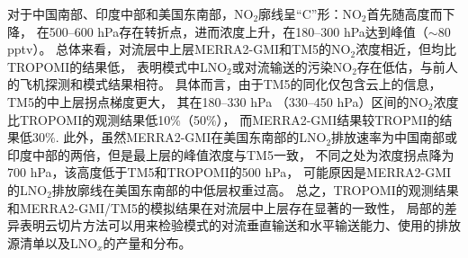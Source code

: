 对于中国南部、印度中部和美国东南部，NO$_2$廓线呈“C”形：NO$_2$首先随高度而下降，
在500--600 hPa存在转折点，进而浓度上升，在180--300 hPa达到峰值（$\sim$80 pptv）。
总体来看，对流层中上层MERRA2-GMI和TM5的NO$_2$浓度相近，但均比TROPOMI的结果低，
表明模式中LNO$_2$或对流输送的污染NO$_2$存在低估，与前人的飞机探测和模式结果相符\citep{Laughner.2019a}。
具体而言，由于TM5的同化仅包含云上的信息，TM5的中上层拐点梯度更大，
其在180--330 hPa （330--450 hPa）区间的NO$_2$浓度比TROPOMI的观测结果低10\%（50\%），
而MERRA2-GMI结果较TROPMI的结果低30\%.
此外，虽然MERRA2-GMI在美国东南部的LNO$_2$排放速率为中国南部或印度中部的两倍，但是最上层的峰值浓度与TM5一致，
不同之处为浓度拐点降为700 hPa，该高度低于TM5和TROPOMI的500 hPa，
可能原因是MERRA2-GMI的LNO$_2$排放廓线在美国东南部的中低层权重过高。
总之，TROPOMI的观测结果和MERRA2-GMI/TM5的模拟结果在对流层中上层存在显著的一致性，
局部的差异表明云切片方法可以用来检验模式的对流垂直输送和水平输送能力、使用的排放源清单以及LNO$_x$的产量和分布。


